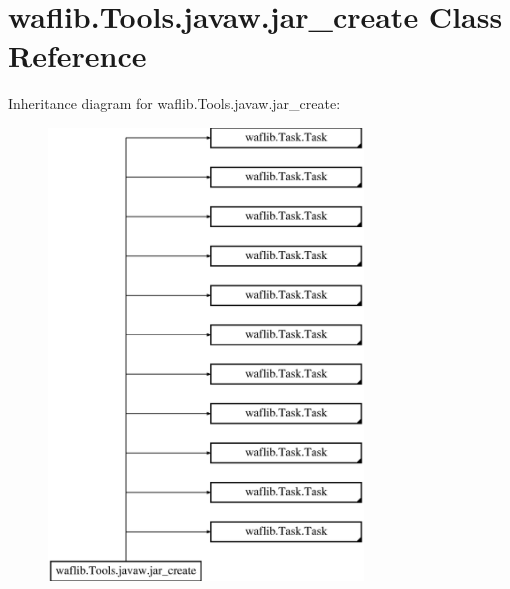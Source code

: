 \hypertarget{classwaflib_1_1_tools_1_1javaw_1_1jar__create}{}\section{waflib.\+Tools.\+javaw.\+jar\+\_\+create Class Reference}
\label{classwaflib_1_1_tools_1_1javaw_1_1jar__create}
Inheritance diagram for waflib.\+Tools.\+javaw.\+jar\+\_\+create\+:\begin{figure}[H]
\begin{center}
\leavevmode
\includegraphics[height=12.000000cm]{classwaflib_1_1_tools_1_1javaw_1_1jar__create}
\end{center}
\end{figure}
